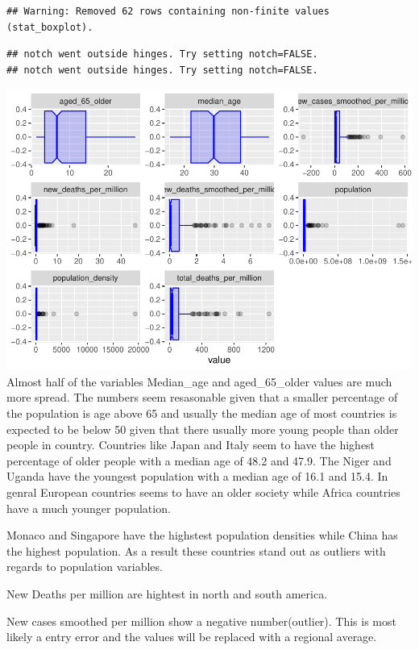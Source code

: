\documentclass[
]{article}
\begin{document}
\begin{verbatim}
## Warning: Removed 62 rows containing non-finite values (stat_boxplot).
\end{verbatim}

\begin{verbatim}
## notch went outside hinges. Try setting notch=FALSE.
## notch went outside hinges. Try setting notch=FALSE.
\end{verbatim}

\includegraphics{Assignment1_files/figure-latex/unnamed-chunk-3-1.pdf}
Almost half of the variables
Median\_age and aged\_65\_older values are much more spread. The numbers seem resasonable given that a smaller percentage of the population is age above 65 and usually the median age of most countries is expected to be below 50 given that there usually more young people than older people in country. Countries like Japan and Italy seem to have the highest percentage of older people with a median age of 48.2 and 47.9. The Niger and Uganda have the youngest population with a median age of 16.1 and 15.4. In genral European countries seems to have an older society while Africa countries have a much younger population.

Monaco and Singapore have the highstest population densities while China has the highest population. As a result these countries stand out as outliers with regards to population variables.

New Deaths per million are hightest in north and south america.

New cases smoothed per million show a negative number(outlier). This is most likely a entry error and the values will be replaced with a regional average.
\end{document}
